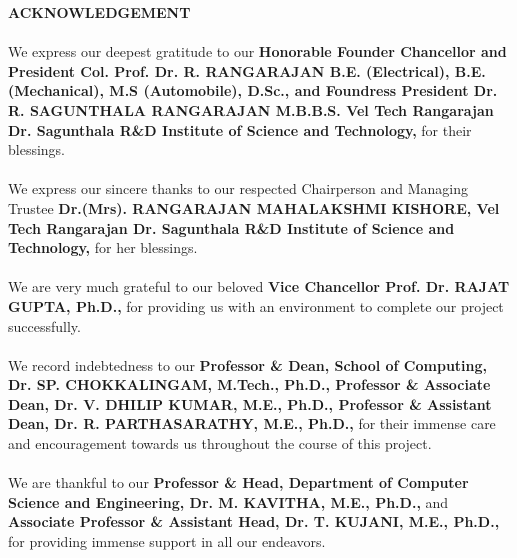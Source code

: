 \documentclass[10pt]{report}
\begin{document}
\newpage
\begin{center}
\LARGE{\textbf{ACKNOWLEDGEMENT}}\\[1cm]
\end{center}
\linespread{1.13}
\begin{sloppypar}

\large{\paragraph{}We express our deepest gratitude to our \textbf{Honorable Founder Chancellor and President Col. Prof. Dr. R. RANGARAJAN B.E. (Electrical), B.E. (Mechanical), M.S (Automobile), D.Sc., and Foundress President Dr. R. SAGUNTHALA RANGARAJAN M.B.B.S. Vel Tech Rangarajan Dr. Sagunthala R\&D Institute of Science and Technology,} for their blessings.

\paragraph{}We express our sincere thanks to our respected Chairperson and Managing Trustee \textbf{Dr.(Mrs). RANGARAJAN MAHALAKSHMI KISHORE, Vel Tech Rangarajan Dr. Sagunthala R\&D Institute of Science and Technology,} for her blessings. 

\paragraph{}We are very much grateful to our beloved \textbf{Vice Chancellor Prof. Dr. RAJAT GUPTA, Ph.D.,} for providing us with an environment to complete our project successfully.

\paragraph{}We record indebtedness to our \textbf{Professor \& Dean, School of Computing, Dr. SP. CHOKKALINGAM, M.Tech., Ph.D., Professor \& Associate Dean, Dr. V. DHILIP KUMAR, M.E., Ph.D., Professor \& Assistant Dean, Dr. R. PARTHASARATHY, M.E., Ph.D.,} for their immense care and encouragement towards us throughout the course of this project.

\paragraph{}We are thankful to our \textbf{Professor \& Head, Department of Computer Science and Engineering, Dr. M. KAVITHA, M.E., Ph.D.,} and \textbf{Associate Professor \& Assistant Head, Dr. T. KUJANI, M.E., Ph.D.,} for providing immense support in all our endeavors.

}
\end{sloppypar}
\end{document}
